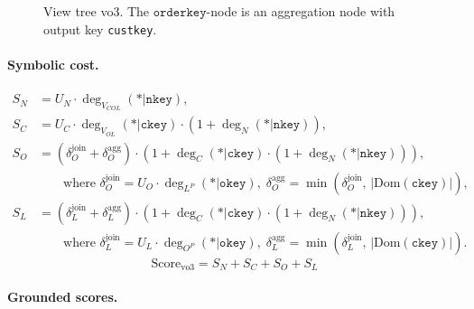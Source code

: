 \begin{figure}[ht]
\centering
{}
\caption{View tree vo3. The $\texttt{orderkey}$-node is an aggregation node with output key \texttt{custkey}.}
\label{fig:vo3}
\end{figure}

\paragraph{Symbolic cost.}
\begin{align*}
S_N &= U_N \cdot \deg_{V_{COL}}(*|\texttt{nkey}), \\[4pt]
S_C &= U_C \cdot \deg_{V_{OL}}(*|\texttt{ckey}) \cdot (1 + \deg_N(*|\texttt{nkey})), \\[4pt]
S_O &= (\delta^{\mathrm{join}}_O + \delta^{\mathrm{agg}}_O) \cdot (1 + \deg_C(*|\texttt{ckey}) \cdot (1 + \deg_N(*|\texttt{nkey}))),
\\
&\qquad \text{where } \delta^{\mathrm{join}}_O = U_O \cdot \deg_{L^P}(*|\texttt{okey}),\;
\delta^{\mathrm{agg}}_O = \min(\delta^{\mathrm{join}}_O,\, |\mathrm{Dom}(\texttt{ckey})|), \\[4pt]
S_L &= (\delta^{\mathrm{join}}_L + \delta^{\mathrm{agg}}_L) \cdot (1 + \deg_C(*|\texttt{ckey}) \cdot (1 + \deg_N(*|\texttt{nkey}))),
\\
&\qquad \text{where } \delta^{\mathrm{join}}_L = U_L \cdot \deg_{O^P}(*|\texttt{okey}),\;
\delta^{\mathrm{agg}}_L = \min(\delta^{\mathrm{join}}_L,\, |\mathrm{Dom}(\texttt{ckey})|).
\end{align*}
\[
\boxed{\mathrm{Score}_{\mathrm{vo3}} = S_N + S_C + S_O + S_L}
\]

\paragraph{Grounded scores.}

